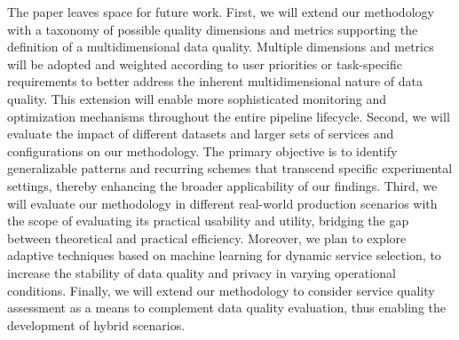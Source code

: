 \documentclass[sn-mathphys-num,referee]{sn-jnl}
\theoremstyle{definition}
\begin{document}
{\color{OurColor}
The paper leaves space for future work. First, we will extend our methodology with a taxonomy of possible quality dimensions and metrics supporting the definition of a multidimensional data quality. Multiple dimensions and metrics will be adopted and weighted according to user priorities or task-specific requirements to better address the inherent multidimensional nature of data quality. This extension will enable more sophisticated monitoring and optimization mechanisms throughout the entire pipeline lifecycle. Second, we will evaluate the impact of different datasets and larger sets of services and configurations on our methodology. The primary objective is to identify generalizable patterns and recurring schemes that transcend specific experimental settings, thereby enhancing the broader applicability of our findings. Third, we will evaluate our methodology in different real-world production scenarios with the scope of evaluating its practical usability and utility, bridging the gap between theoretical and practical efficiency. Moreover, we plan to explore adaptive techniques based on machine learning for dynamic service selection, to increase the stability of data quality and privacy in varying operational conditions. Finally, we will extend our methodology to consider service quality assessment as a means to complement data quality evaluation, thus enabling the development of hybrid scenarios.}



\clearpage

\end{document}
